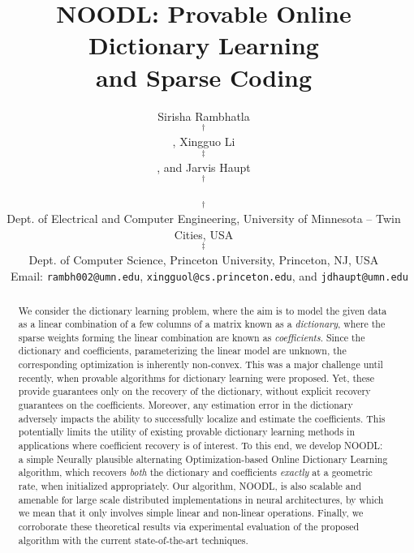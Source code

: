 \documentclass{article}
\def\[#1\]{{$#1$}}
\begin{document}
\title{NOODL: Provable Online Dictionary Learning \\ and Sparse Coding \vspace{-12pt}}

\author{\normalsize Sirisha Rambhatla\[^\dagger\], Xingguo Li\[^\ddagger\], and Jarvis Haupt\[^\dagger\]\\ \[^\dagger\]Dept. of Electrical and Computer Engineering, University of Minnesota -- Twin Cities, USA\\ \[^\ddagger\]Dept. of Computer Science, Princeton University, Princeton, NJ, USA \\{\small ~~Email: \texttt{rambh002@umn.edu},  \texttt{xingguol@cs.princeton.edu}, and \texttt{jdhaupt@umn.edu}}\vspace{-14pt}}

\date{}

\maketitle

\begin{abstract}
	\vspace{-5pt}

We consider the dictionary learning problem, where the aim is to model the given data as a linear combination of a few columns of a matrix known as a \textit{dictionary}, where the sparse weights forming the linear combination are known as \textit{coefficients}. Since the dictionary and coefficients, parameterizing the linear model are unknown, the corresponding optimization is inherently non-convex. This was a major challenge until recently, when provable algorithms for dictionary learning were proposed. Yet, these provide guarantees only on the recovery of the dictionary, without explicit recovery guarantees on the coefficients. Moreover, any estimation error in the dictionary adversely impacts the ability to successfully localize and estimate the coefficients. This potentially limits the utility of existing provable dictionary learning methods in applications where coefficient recovery is of interest. To this end, we develop NOODL: a simple Neurally plausible alternating Optimization-based Online Dictionary Learning algorithm, which recovers \textit{both} the dictionary and coefficients \textit{exactly} at a geometric rate, when initialized appropriately. Our algorithm, NOODL, is also scalable and amenable for large scale distributed implementations in neural architectures, by which we mean that it only involves simple linear and non-linear operations. Finally, we corroborate these theoretical results via experimental evaluation of the proposed algorithm with the current state-of-the-art techniques.


 
 




\end{abstract}
\end{document}
